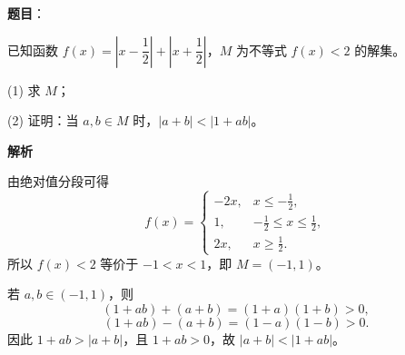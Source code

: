\begin{answer}

\textbf{题目}：

已知函数 \(f(x)=\left|x-\dfrac12\right|+\left|x+\dfrac12\right|\)，\(M\) 为不等式 \(f(x)<2\) 的解集。

   (1) 求 \(M\)；

   (2) 证明：当 \(a,b\in M\) 时，\(|a+b|<|1+ab|\)。

\textbf{解析}


由绝对值分段可得
\nopagebreak[4]
\[
f(x)=\begin{cases}
-2x,&x\le-\frac12,\\
1,&-\frac12\le x\le\frac12,\\
2x,&x\ge\frac12.
\end{cases}
\]
所以 \(f(x)<2\) 等价于 \(-1<x<1\)，即 \(M=(-1,1)\)。


若 \(a,b\in(-1,1)\)，则
\nopagebreak[4]
\[
(1+ab)+(a+b)=(1+a)(1+b)>0,
\]
\nopagebreak[4]
\[
(1+ab)-(a+b)=(1-a)(1-b)>0.
\]
因此 \(1+ab>|a+b|\)，且 \(1+ab>0\)，故 \(|a+b|<|1+ab|\)。



\end{answer}